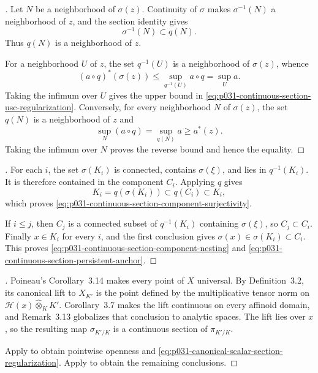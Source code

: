 
\begin{proof}[]
Let $N$ be a neighborhood of $\sigma(z)$.  Continuity of $\sigma$ makes
$\sigma^{-1}(N)$ a neighborhood of $z$, and the section identity gives
\[
                    \sigma^{-1}(N)\subset q(N).
\]
Thus $q(N)$ is a neighborhood of $z$.

For a neighborhood $U$ of $z$, the set $q^{-1}(U)$ is a neighborhood of
$\sigma(z)$, whence
\[
 (a\circ q)^*(\sigma(z))
   \leq \sup_{q^{-1}(U)}a\circ q
   =\sup_U a.
\]
Taking the infimum over $U$ gives the upper bound in
\eqref{eq:p031-continuous-section-usc-regularization}.  Conversely, for
every neighborhood $N$ of $\sigma(z)$, the set $q(N)$ is a neighborhood of
$z$ and
\[
                  \sup_N(a\circ q)=\sup_{q(N)}a\geq a^*(z).
\]
Taking the infimum over $N$ proves the reverse bound and hence the equality.
\end{proof}

\begin{proof}[]
For each $i$, the set $\sigma(K_i)$ is connected, contains
$\sigma(\xi)$, and lies in $q^{-1}(K_i)$.  It is therefore contained in the
component $C_i$.  Applying $q$ gives
\[
        K_i=q(\sigma(K_i))\subset q(C_i)\subset K_i,
\]
which proves
\eqref{eq:p031-continuous-section-component-surjectivity}.

If $i\leq j$, then $C_j$ is a connected subset of $q^{-1}(K_i)$ containing
$\sigma(\xi)$, so $C_j\subset C_i$.  Finally $x\in K_i$ for every $i$, and
the first conclusion gives $\sigma(x)\in\sigma(K_i)\subset C_i$.  This proves
\eqref{eq:p031-continuous-section-component-nesting} and
\eqref{eq:p031-continuous-section-persistent-anchor}.
\end{proof}

\begin{proof}[]
Poineau's Corollary~3.14 makes every point of $X$ universal.  By
Definition~3.2, its canonical lift to $X_{K'}$ is the point defined by the
multiplicative tensor norm on
$\mathcal H(x)\widehat\otimes_KK'$.  Corollary~3.7 makes the lift continuous
on every affinoid domain, and Remark~3.13 globalizes that conclusion to
analytic spaces.  The lift lies over $x$, so the resulting map
$\sigma_{K'/K}$ is a continuous section of $\pi_{K'/K}$.

Apply
 to obtain pointwise
openness and
\eqref{eq:p031-canonical-scalar-section-regularization}.  Apply
 to obtain the
remaining conclusions.
\end{proof}

